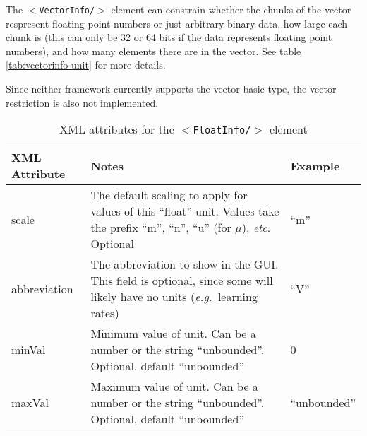 \documentclass[pdftex,a4paper]{article}
\newcommand{\eg}{{\em e.g.\ }}
\newcommand{\et}{{\it etc}}
\newcommand{\XML}[2][]{{\tt \small $<$#2#1/$>$}}
\begin{document}
The \XML{VectorInfo} element can constrain whether the chunks of the
vector respresent floating point numbers or just arbitrary binary
data, how large each chunk is (this can only be 32 or 64 bits if the
data represents floating point numbers), and how many elements there
are in the vector. See table \ref{tab:vectorinfo-unit} for more details.

Since neither framework currently supports the vector basic type, the vector
restriction is also not implemented.

\begin{table}[!h]
  \begin{center}
    \caption{XML attributes for the \XML{FloatInfo} element}
    \label{tab:floatinfo-unit}
    \begin{tabular}{|l|p{6cm}|l|}
      \hline

      \textbf{XML Attribute} & \textbf{Notes} & \textbf{Example}\\

      \hline

      scale & The default scaling to apply for values of this ``float''
      unit. Values take the prefix ``m'', ``n'', ``u'' (for $\mu$),
      \et. Optional & ``m'' \\

      \hline

      abbreviation & The abbreviation to show in the GUI. This field
      is optional, since some will likely have no units (\eg learning
      rates) & ``V'' \\

      \hline

      minVal & Minimum value of unit. Can be a number or the string
      ``unbounded''. Optional, default ``unbounded'' & 0\\

      \hline

      maxVal & Maximum value of unit. Can be a number or the string
      ``unbounded''. Optional, default ``unbounded'' & ``unbounded'' \\

      \hline

    \end{tabular}
  \end{center}
\end{table}
\end{document}
